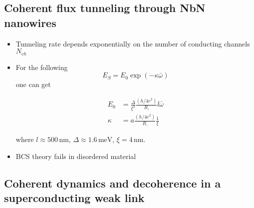   \subsection{Coherent     flux     tunneling      through     NbN     nanowires
    \cite{Peltonen_2013}}
  \label{sec:coher-flux-tunn}
  \begin{framed}\noindent
    \begin{itemize}
    \item  Tunneling rate  depends  exponentially on  the  number of  conducting
      channels $N_{ch}$
    \item For the following
      \begin{equation}
        E_{S} = E_0\exp(-\kappa \bar{\omega})
      \end{equation}
      \noindent one can get

      \begin{equation}
        \begin{aligned}
          E_0 & = \frac{\Delta}{\xi^2} \frac{\left( h/4e^2 \right)}{R_{\square}}l\bar{\omega} \\
          \kappa & = a \frac{\left( h/4e^2 \right)}{R_{\square}}\frac{1}{\xi}
        \end{aligned}
      \end{equation}

      \noindent            where           $l\approx            500\,\text{nm}$,
      $\Delta \approx 1.6\,\text{meV}$, $\xi=4\,\text{nm}$.
    \item BCS theory fails in disordered material
    \end{itemize}
  \end{framed}

  \subsection{Coherent dynamics  and decoherence in a  superconducting weak link
    \cite{Peltonen_2016}}
  \label{sec:coher-dynam-decoh}

